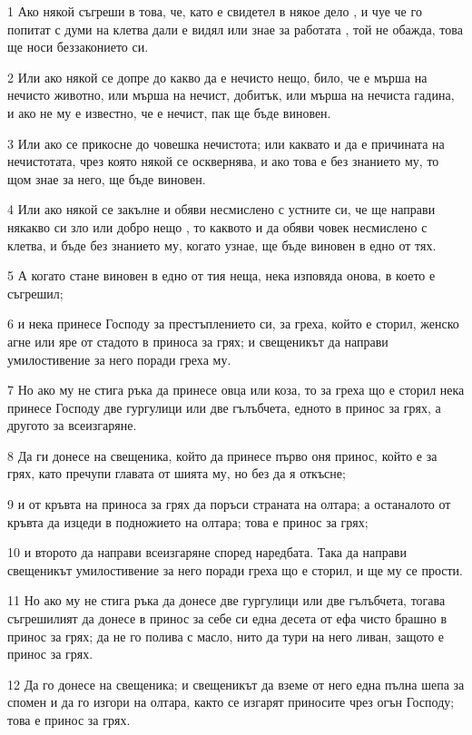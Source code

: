 \par 1 Ако някой съгреши в това, че, като е свидетел в някое дело , и чуе че го попитат с думи на клетва дали е видял или знае за работата , той не обажда, това ще носи беззаконието си.
\par 2 Или ако някой се допре до какво да е нечисто нещо, било, че е мърша на нечисто животно, или мърша на нечист, добитък, или мърша на нечиста гадина, и ако не му е известно, че е нечист, пак ще бъде виновен.
\par 3 Или ако се прикосне до човешка нечистота; или каквато и да е причината на нечистотата, чрез която някой се осквернява, и ако това е без знанието му, то щом знае за него, ще бъде виновен.
\par 4 Или ако някой се закълне и обяви несмислено с устните си, че ще направи някакво си зло или добро нещо , то каквото и да обяви човек несмислено с клетва, и бъде без знанието му, когато узнае, ще бъде виновен в едно от тях.
\par 5 А когато стане виновен в едно от тия неща, нека изповяда онова, в което е съгрешил;
\par 6 и нека принесе Господу за престъплението си, за греха, който е сторил, женско агне или яре от стадото в приноса за грях; и свещеникът да направи умилостивение за него поради греха му.
\par 7 Но ако му не стига ръка да принесе овца или коза, то за греха що е сторил нека принесе Господу две гургулици или две гълъбчета, едното в принос за грях, а другото за всеизгаряне.
\par 8 Да ги донесе на свещеника, който да принесе първо оня принос, който е за грях, като пречупи главата от шията му, но без да я откъсне;
\par 9 и от кръвта на приноса за грях да поръси страната на олтара; а останалото от кръвта да изцеди в подножието на олтара; това е принос за грях;
\par 10 и второто да направи всеизгаряне според наредбата. Така да направи свещеникът умилостивение за него поради греха що е сторил, и ще му се прости.
\par 11 Но ако му не стига ръка да донесе две гургулици или две гълъбчета, тогава съгрешилият да донесе в принос за себе си една десета от ефа чисто брашно в принос за грях; да не го полива с масло, нито да тури на него ливан, защото е принос за грях.
\par 12 Да го донесе на свещеника; и свещеникът да вземе от него една пълна шепа за спомен и да го изгори на олтара, както се изгарят приносите чрез огън Господу; това е принос за грях.
